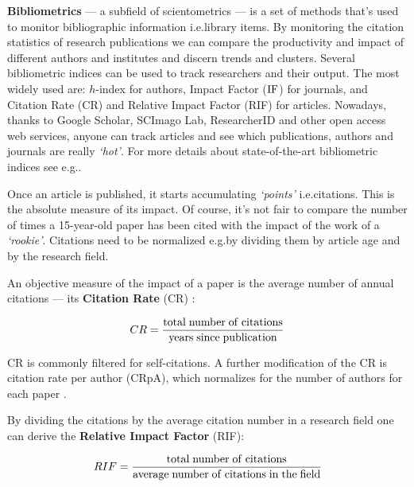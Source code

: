 \documentclass[graybox,envcountchap,sectrefs,UStrade]{svmono}
\newenvironment{fminipage}{\begin{Sbox}\begin{minipage}}{\end{minipage}\end{Sbox}\fbox{\TheSbox}}
\begin{document}
\bigskip
\begin{fminipage}{.9\textwidth}{\footnotesize{\textsf{\textbf{Bibliometrics}} --- a subfield of scientometrics --- is a set of methods that's used to monitor bibliographic information i.e.\@ library items. By monitoring the citation statistics of research publications we can compare the productivity and impact of different authors and institutes and discern trends and clusters. Several bibliometric indices can be used to track researchers and their output. The most widely used are: $h$-index for authors, Impact Factor ($\rm IF$) for journals, and Citation Rate (CR) and Relative Impact Factor (RIF) for articles. Nowadays, thanks to Google Scholar, SCImago Lab, ResearcherID and other open access web services, anyone can track articles and see which publications, authors and journals are really \emph{`hot'}. For more details about state-of-the-art bibliometric indices see e.g.\@ \citet{Harzing2010}.}}
\end{fminipage}
\bigskip

Once an article is published, it starts accumulating \emph{`points'} i.e.\@ citations. This is the absolute measure of its impact. Of course, it's not fair to compare the number of times a 15-year-old paper has been cited with the impact of the work of a \emph{`rookie'}. Citations need to be normalized e.g.\@ by dividing them by article age and by the research field.\par

An objective measure of the impact of a paper is the average number of annual citations --- its \textbf{Citation Rate} (CR) \citep{Garfield1990CC}:

\begin{equation}\label{E:CR}
   CR = \frac{{\rm total} \; {\rm number} \; {\rm of} \; {\rm citations}}{{\rm years} \; {\rm since} \; {\rm publication}}
\end{equation}

CR is commonly filtered for self-citations. A further modification of the CR is citation rate per author (CRpA), which normalizes for the number of authors for each paper \citep{Harzing2010}.\par{}

By dividing the citations by the average citation number in a research field one can derive the \textbf{Relative Impact Factor} (RIF):

\begin{equation}\label{E:RI}
   RIF = \frac{{\rm total} \; {\rm number} \; {\rm of} \; {\rm citations}}{{\rm average} \; {\rm number} \; {\rm of} \; {\rm citations} \; {\rm in} \; {\rm the} \; {\rm field}}
\end{equation}
\end{document}

